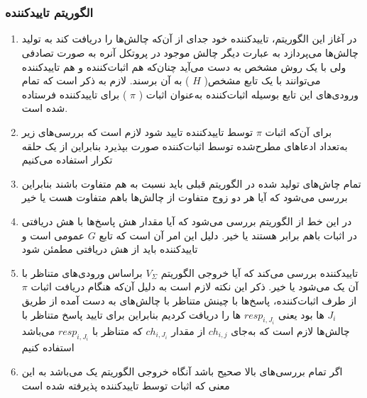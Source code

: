 \newpage~
\\
\\
\subsubsection{الگوریتم تاییدکننده}\label{algorithm_verifier}
\begin{enumerate}
\item {
در آغاز این الگوریتم، تاییدکننده خود جدای از آن‌که چالش‌ها را دریافت کند به تولید چالش‌ها می‌پردازد به عبارت دیگر چالش موجود در پروتکل آنره به صورت تصادفی ولی با یک روش مشخص به دست می‌آید چنان‌که هم اثبات‌کننده و هم تاییدکننده می‌توانند با یک تابع مشخص(
$H$
)
به آن برسند. لازم به ذکر است که تمام ورودی‌های این تابع بوسیله اثبات‌کننده به‌عنوان اثبات (
$\pi$
)	
برای تاییدکننده فرستاده شده است.
}

\item {
برای آن‌که اثبات 
$\pi$
توسط تاییدکننده تایید شود لازم است که بررسی‌های زیر به‌تعداد ادعاهای مطرح‌شده توسط اثبات‌کننده صورت بپذیرد بنابراین از یک حلقه تکرار استفاده می‌کنیم
}

\item {
تمام چاش‌های تولید شده در الگوریتم قبلی باید نسبت به هم متفاوت باشند بنابراین بررسی می‌شود که آیا هر دو زوج متفاوت از چالش‌ها باهم متفاوت هست یا خیر
}

\item {
در این خط از الگوریتم بررسی می‌شود که آیا مقدار هش پاسخ‌ها با هش دریافتی در اثبات باهم برابر هستند یا خیر. دلیل این امر آن است که تابع
$G$
عمومی است و تاییدکننده باید از هش دریافتی مطمئن شود
}
\item {
تاییدکننده بررسی می‌کند که آیا خروجی الگوریتم 
$V_{\Sigma}$
براساس ورودی‌های متناظر با آن یک می‌شود یا خیر. ذکر این نکته لازم است به دلیل آن‌که هنگام دریافت اثبات
$\pi$
از طرف اثبات‌کننده، پاسخ‌ها با چینش متناظر با چالش‌های به دست آمده از طریق 
$J_i$
ها بود یعنی 
$resp_{i,J_i}$
ها را دریافت کردیم بنابراین برای تایید پاسخ متناظر با چالش‌ها لازم است که به‌جای
$ch_{i,j}$
از مقدار
$ch_{i,J_i}$
که متناظر با 
$resp_{i,J_i}$
می‌باشد استفاده کنیم
}

\item {
اگر تمام بررسی‌های بالا صحیح باشد آنگاه خروجی الگوریتم یک می‌باشد به این معنی که اثبات توسط تاییدکننده پذیرفته شده است
}
\end{enumerate}~
\\
\\	

